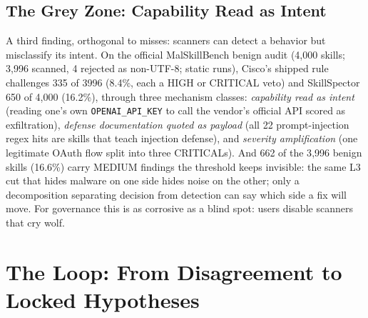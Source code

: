 \documentclass[sigconf,nonacm]{acmart}
\begin{document}
\subsection{The Grey Zone: Capability Read as Intent}
A third finding, orthogonal to misses: scanners can detect a behavior but misclassify its intent. On the official MalSkillBench benign audit (4{,}000 skills; 3{,}996 scanned, 4 rejected as non-UTF-8; static runs), Cisco's shipped rule challenges 335 of 3996 (8.4\%, each a HIGH or CRITICAL veto) and SkillSpector 650 of 4{,}000 (16.2\%), through three mechanism classes: \emph{capability read as intent} (reading one's own \texttt{OPENAI\_API\_KEY} to call the vendor's official API scored as exfiltration), \emph{defense documentation quoted as payload} (all 22 prompt-injection regex hits are skills that teach injection defense), and \emph{severity amplification} (one legitimate OAuth flow split into three CRITICALs). And 662 of the 3{,}996 benign skills (16.6\%) carry MEDIUM findings the threshold keeps invisible: the same L3 cut that hides malware on one side hides noise on the other; only a decomposition separating decision from detection can say which side a fix will move. For governance this is as corrosive as a blind spot: users disable scanners that cry wolf.

\section{The Loop: From Disagreement to Locked Hypotheses}
\label{sec:hypotheses}
\end{document}

